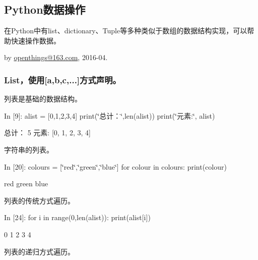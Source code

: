 \documentclass[letterpaper,10pt,english]{sphinxmanual}
\def\PYGZdq{\char`\"}
\begin{document}
\subsection{Python数据操作}
\label{pystart/pystart_databasic:Python_u6570_u636e_u64cd_u4f5c}\label{pystart/pystart_databasic::doc}
在Python中有list、dictionary、Tuple等多种类似于数组的数据结构实现，可以帮助快速操作数据。

by
\href{http://my.oschina.net/u/2306127/blog?catalog=3420733}{openthings@163.com},
2016-04.


\subsubsection{List，使用{[}a,b,c,...{]}方式声明。}
\label{pystart/pystart_databasic:List_uff0c_u4f7f_u7528_a,b,c,...__u65b9_u5f0f_u58f0_u660e_u3002}
列表是基础的数据结构。

\begin{OriginalVerbatim}[commandchars=\\\{\}]
\textcolor{nbsphinxin}{In [9]: }alist = [0,1,2,3,4]
        print(\PYGZdq{}总计：\PYGZdq{},len(alist))
        print(\PYGZdq{}元素:\PYGZdq{}, alist)
\end{OriginalVerbatim}
\begin{OriginalVerbatim}[commandchars=\\\{\}]
总计： 5
元素: [0, 1, 2, 3, 4]
\end{OriginalVerbatim}
字符串的列表。

\begin{OriginalVerbatim}[commandchars=\\\{\}]
\textcolor{nbsphinxin}{In [20]: }colours = [\PYGZdq{}red\PYGZdq{},\PYGZdq{}green\PYGZdq{},\PYGZdq{}blue\PYGZdq{}]
         for colour in colours:
             print(colour)
\end{OriginalVerbatim}
\begin{OriginalVerbatim}[commandchars=\\\{\}]
red
green
blue
\end{OriginalVerbatim}
列表的传统方式遍历。

\begin{OriginalVerbatim}[commandchars=\\\{\}]
\textcolor{nbsphinxin}{In [24]: }for i in range(0,len(alist)):
             print(alist[i])
\end{OriginalVerbatim}
\begin{OriginalVerbatim}[commandchars=\\\{\}]
0
1
2
3
4
\end{OriginalVerbatim}
列表的递归方式遍历。
\end{document}
